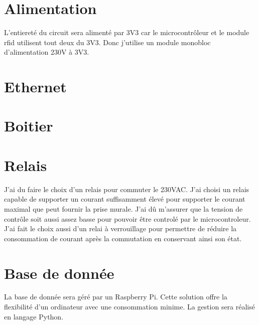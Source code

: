 \section{Alimentation}
L'entiereté du circuit sera alimenté par 3V3 car le microcontrôleur et le module rfid utilisent tout deux du 3V3. 
Donc j'utilise un module monobloc d'alimentation 230V à 3V3. 

\section{Ethernet}

\section{Boitier}

\section{Relais}
J'ai du faire le choix d'un relais pour commuter le 230VAC. J'ai choisi un relais capable de supporter un courant suffisamment élevé pour supporter le courant maximal que peut fournir la prise murale. J'ai dû m'assurer que la tension de contrôle soit aussi assez basse pour pouvoir être controlé par le microcontroleur.
J'ai fait le choix aussi d'un relai à verrouillage pour permettre de réduire la consommation de courant après la commutation en conservant ainsi son état.

\section{Base de donnée}
La base de donnée sera géré par un Raspberry Pi. Cette solution offre la flexibilité d'un ordinateur avec une consommation minime. La gestion sera réalisé en langage Python.
